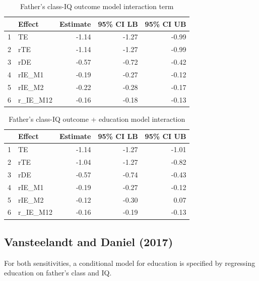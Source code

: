 \documentclass[12pt]{article} %
\numberwithin{equation}{section} %
\begin{document}
\begin{table}[ht]
\centering
\begin{tabular}{rlrrr}
  \hline
 & Effect & Estimate & 95\% CI LB & 95\% CI UB \\ 
  \hline
1 & TE & -1.14 & -1.27 & -0.99 \\ 
  2 & rTE & -1.14 & -1.27 & -0.99 \\ 
  3 & rDE & -0.57 & -0.72 & -0.42 \\ 
  4 & rIE\_M1 & -0.19 & -0.27 & -0.12 \\ 
  5 & rIE\_M2 & -0.22 & -0.28 & -0.17 \\ 
  6 & r\_IE\_M12 & -0.16 & -0.18 & -0.13 \\ 
   \hline
\end{tabular}
\caption{Father's class-IQ outcome model interaction term}
\end{table}

\begin{table}[ht]
\centering
\begin{tabular}{rlrrr}
  \hline
 & Effect & Estimate & 95\% CI LB & 95\% CI UB \\ 
  \hline
1 & TE & -1.14 & -1.27 & -1.01 \\ 
  2 & rTE & -1.04 & -1.27 & -0.82 \\ 
  3 & rDE & -0.57 & -0.74 & -0.43 \\ 
  4 & rIE\_M1 & -0.19 & -0.27 & -0.12 \\ 
  5 & rIE\_M2 & -0.12 & -0.30 & 0.07 \\ 
  6 & r\_IE\_M12 & -0.16 & -0.19 & -0.13 \\ 
   \hline
\end{tabular}
\caption{Father's class-IQ outcome + education model interaction}
\end{table}

\newpage

\subsection{Vansteelandt and Daniel (2017)}

For both sensitivities, a conditional model for education is specified by regressing education on father's class
and IQ. 
\end{document}
